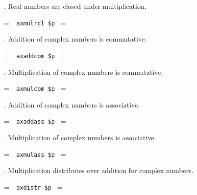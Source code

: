 . Real numbers are closed under multiplication.

\setbox\startprefix=\hbox{\tt \ \ axmulrcl\ \$p\ }
\setbox\contprefix=\hbox{\tt \ \ \ \ \ \ \ \ \ \ \ \ \ \ }
\startm
\m{\vdash}\m{(}\m{(}\m{\in}\m{\wedge}\m{\in}%
\m{)}\m{\rightarrow}\m{(}\m{\cdot}\m{)}\m{\in}\m{)}
\endm

. Addition of complex numbers is commutative.

\setbox\startprefix=\hbox{\tt \ \ axaddcom\ \$p\ }
\setbox\contprefix=\hbox{\tt \ \ \ \ \ \ \ \ \ \ \ \ \ \ }
\startm
\m{\vdash}\m{(}\m{(}\m{\in}\m{\wedge}\m{\in}%
\m{)}\m{\rightarrow}\m{(}\m{+}\m{)}\m{=}\m{(}\m{+}\m{)}%
\m{)}
\endm

. Multiplication of complex numbers is commutative.

\setbox\startprefix=\hbox{\tt \ \ axmulcom\ \$p\ }
\setbox\contprefix=\hbox{\tt \ \ \ \ \ \ \ \ \ \ \ \ \ \ }
\startm
\m{\vdash}\m{(}\m{(}\m{\in}\m{\wedge}\m{\in}%
\m{)}\m{\rightarrow}\m{(}\m{\cdot}\m{)}\m{=}\m{(}\m{\cdot}%
\m{)}\m{)}
\endm

. Addition of complex numbers is associative.

\setbox\startprefix=\hbox{\tt \ \ axaddass\ \$p\ }
\setbox\contprefix=\hbox{\tt \ \ \ \ \ \ \ \ \ \ \ \ \ \ }
\startm
\m{\vdash}\m{(}\m{(}\m{\in}\m{\wedge}\m{\in}%
\m{\wedge}\m{\in}\m{)}\m{\rightarrow}\m{(}\m{(}\m{+}%
\m{)}\m{+}\m{)}\m{=}\m{(}\m{+}\m{(}\m{+}\m{)}\m{)}%
\m{)}
\endm

. Multiplication of complex numbers is associative.

\setbox\startprefix=\hbox{\tt \ \ axmulass\ \$p\ }
\setbox\contprefix=\hbox{\tt \ \ \ \ \ \ \ \ \ \ \ \ \ \ }
\startm
\m{\vdash}\m{(}\m{(}\m{\in}\m{\wedge}\m{\in}%
\m{\wedge}\m{\in}\m{)}\m{\rightarrow}\m{(}\m{(}\m{\cdot}%
\m{)}\m{\cdot}\m{)}\m{=}\m{(}\m{\cdot}\m{(}\m{\cdot}%
\m{)}\m{)}\m{)}
\endm

. Multiplication distributes over addition for complex numbers.

\setbox\startprefix=\hbox{\tt \ \ axdistr\ \$p\ }
\setbox\contprefix=\hbox{\tt \ \ \ \ \ \ \ \ \ \ \ \ \ }
\startm
\m{\vdash}\m{(}\m{(}\m{\in}\m{\wedge}\m{\in}%
\m{\wedge}\m{\in}\m{)}\m{\rightarrow}\m{(}\m{\cdot}\m{(}%
\m{+}\m{)}\m{)}\m{=}\m{(}\m{(}\m{\cdot}\m{)}\m{+}\m{(}%
\m{\cdot}\m{)}\m{)}\m{)}
\endm

